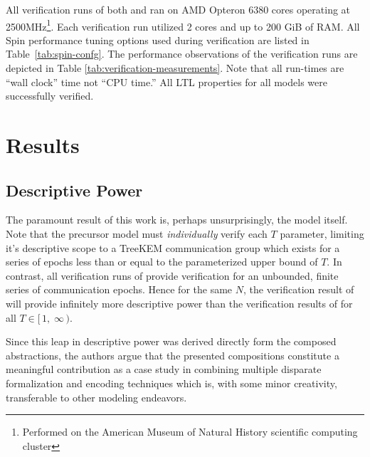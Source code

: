 \documentclass[runningheads]{llncs}
\newcommand{\Abrev}[1]{\gls{#1}}
\newcommand{\NumericRangeOpenR}[2]{\ensuremath{[\,#1,\; #2\,)}\xspace}
\begin{document}
All verification runs of both  and  ran on AMD Opteron 6380 cores operating at 2500MHz\footnote{Performed on the American Museum of Natural History scientific computing cluster}.
Each verification run utilized 2 cores and up to 200 GiB of RAM.
All Spin performance tuning options used during verification are listed in Table~\ref{tab:spin-confg}.
The performance observations of the verification runs are depicted in Table \ref{tab:verification-measurements}.
Note that all run-times are ``wall clock'' time not ``CPU time.''
All \Abrev{LTL} properties for all models were successfully verified.


\section{Results}

\subsection{Descriptive Power\label{sec:descriptive-power}}

The paramount result of this work is, perhaps unsurprisingly, the model  itself.
Note that the precursor model  must \emph{individually} verify each $T$ parameter, limiting it's descriptive scope to a TreeKEM communication group which exists for a series of epochs less than or equal to the parameterized upper bound of $T$.
In contrast, all verification runs of   provide verification for an unbounded, finite series of communication epochs.
Hence for the same $N$, the verification result of  will provide infinitely more descriptive power than the verification results of  for all $T \in \NumericRangeOpenR{1}{\infty}$. %

Since this leap in descriptive power was derived directly form the composed abstractions, the authors argue that the presented compositions constitute a meaningful contribution as a case study in combining multiple disparate formalization and encoding techniques which is, with some minor creativity, transferable to other modeling endeavors.
\end{document}
